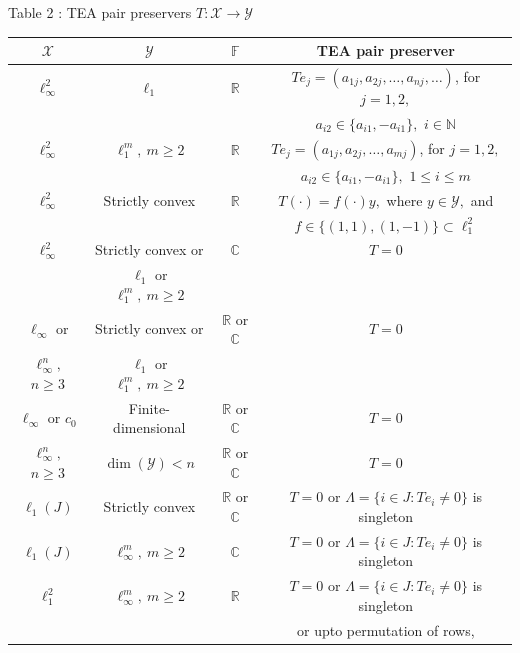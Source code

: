 \documentclass{amsart}
\theoremstyle{definition}
\theoremstyle{remark}
\numberwithin{equation}{section}
\begin{document}
   \vspace{.3cm}
   \begin{center}
   	Table 2 : TEA pair preservers $T:\mathcal{X}\to \mathcal{Y}$
   	\begin{tabular}{ |c|c|c|c|} 
   		\hline
   		$\mathcal{X}$ & $\mathcal{Y}$ & $\mathbb{F}$ & TEA pair preserver\\ 
   		\hline
   		$\ell_\infty^2$ & $\ell_1$   & $\mathbb{R}$& $Te_j=(a_{1j},a_{2j},\ldots,a_{nj},\ldots)$, for $j=1,2,$ \\
   		&&& $a_{i2}\in \{a_{i1},-a_{i1}\},$ $i\in \mathbb{N}$\\
   		\hline
   		$\ell_\infty^2$ &  $\ell_1^m,~m\geq 2$  & $\mathbb{R}$& $Te_j=(a_{1j},a_{2j},\ldots,a_{mj})$, for $j=1,2,$ \\
   		&&& $a_{i2}\in \{a_{i1},-a_{i1}\},$ $1\leq i\leq m$\\
   		\hline
   		$\ell_\infty^2$ &  Strictly convex  & $\mathbb{R}$& $T(\cdot)=f(\cdot)y,$ where $y\in \mathcal{Y}, $ and \\
   		&&&$f\in \{(1,1),(1,-1)\}\subset \ell_1^2$ \\
   		\hline
   		$\ell_\infty^2$ &  Strictly convex or   & $\mathbb{C}$& $T=0$\\
   		&$\ell_1$ or  $\ell_1^m,~m\geq 2$&&\\
   		\hline
   		$\ell_\infty$ or  &  Strictly convex or   & $\mathbb{R}$ or $\mathbb{C}$& $T=0$\\
   		$\ell_\infty^n,$ $n\geq 3$	&$\ell_1$ or  $\ell_1^m,~m\geq 2$&&\\
   		\hline
   		$\ell_\infty$ or $c_0$ &  Finite-dimensional   & $\mathbb{R}$ or $\mathbb{C}$& $T=0$\\
   		\hline
   		$\ell_\infty^n,$ $n\geq 3$&  $\dim(\mathcal{Y})<n$   & $\mathbb{R}$ or $\mathbb{C}$& $T=0$\\
   		\hline
   		$\ell_1(J)$ &  Strictly convex   & $\mathbb{R}$ or $\mathbb{C}$ & $T=0$ or $\Lambda=\{i\in J:Te_i\neq 0\}$ is singleton \\
   		\hline
   			$\ell_1(J)$ & $ \ell_\infty^m,~m\geq 2$   & $\mathbb{C}$ & $T=0$ or $\Lambda=\{i\in J:Te_i\neq 0\}$ is singleton \\
   		\hline
   			$\ell_1^2$ & $ \ell_\infty^m,~m\geq 2$   & $\mathbb{R}$ & $T=0$ or $\Lambda=\{i\in J:Te_i\neq 0\}$ is singleton \\
   		&&& or upto permutation of rows, \\

\end{tabular}
\end{center}
\end{document}

